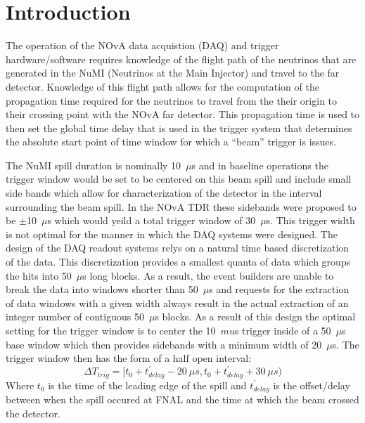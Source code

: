 \section{Introduction}

The operation of the NOvA data acquistion (DAQ) and trigger hardware/software requires knowledge of the flight path of the neutrinos that are generated in the NuMI (Neutrinos at the Main Injector) and travel to the far detector.  Knowledge of this flight path allows for the computation of the propagation time required for the neutrinos to travel from the their origin to their crossing point with the NOvA far detector.  This propagation time is used to then set the global time delay that is used in the trigger system that determines the absolute start point of time window for which a ``beam'' trigger is issues.

The NuMI spill duration is nominally 10~$\mu$s and in baseline operations the trigger window would be set to be centered on this beam spill and include small side bands which allow for characterization of the detector in the interval surrounding the beam spill.  In the NOvA TDR these sidebands were proposed to be $\pm$10~$\mu$s which would yeild a total trigger window of 30~$\mu$s.  This trigger width is not optimal for the manner in which the DAQ systems were designed.  The design of the DAQ readout systems relys on a natural time based discretization of the data.  This discretization provides a smallest quanta of data which groups the hits into 50~$\mu$s long blocks.  As a result, the event builders are unable to break the data into windows shorter than 50~$\mu$s and requests for the extraction of data windows with a given width always result in the actual extraction of an integer number of contiguous 50~$\mu$s blocks.  As a result of this design the optimal setting for the trigger  window is to center the 10~$mu$s trigger inside of a 50~$\mu$s base window which then provides sidebands with a minimum width of 20~$\mu$s.  The trigger window then has the form of a half open interval:
\begin{equation}
\Delta T_{trig} = [ t_{0} + t^\prime_{delay} - 20~\mu s , t_{0} + t^{\prime}_{delay}+ 30~\mu s)
\end{equation}
Where $t_{0}$ is the time of the leading edge of the spill and $t^{\prime}_{delay}$ is the offset/delay between when the spill occured at FNAL and the time at which the beam crossed the detector.

